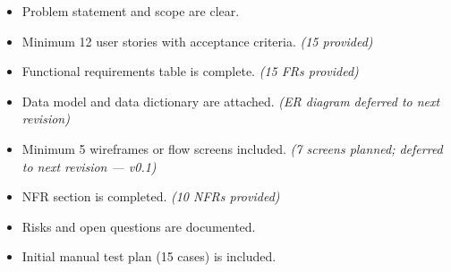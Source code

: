\documentclass[12pt,letterpaper]{article}
\newcommand{\checked}{\ding{51}}   %
\newcommand{\unchecked}{\square}   %
\begin{document}
\begin{itemize}[label={}]
  \item[\checked] Problem statement and scope are clear.
  \item[\checked] Minimum 12 user stories with acceptance criteria. \textit{(15 provided)}
  \item[\checked] Functional requirements table is complete. \textit{(15 FRs provided)}
  \item[\unchecked] Data model and data dictionary are attached. \textit{(ER diagram deferred to next revision)}
  \item[\unchecked] Minimum 5 wireframes or flow screens included. \textit{(7 screens planned; deferred to next revision --- v0.1)}
  \item[\checked] NFR section is completed. \textit{(10 NFRs provided)}
  \item[\checked] Risks and open questions are documented.
  \item[\checked] Initial manual test plan (15 cases) is included.
\end{itemize}
\end{document}
